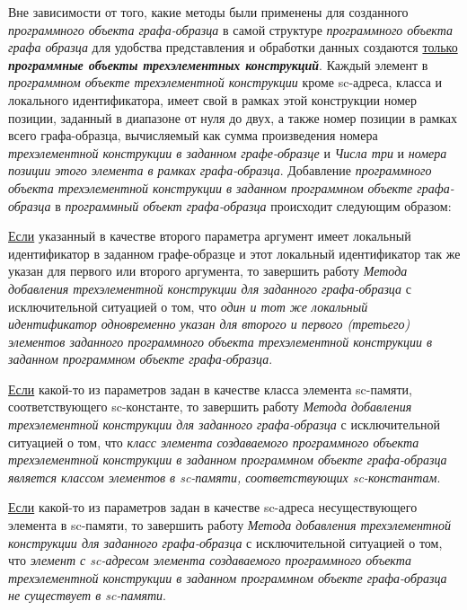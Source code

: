 \begin{SCn}
\begin{scnsubstruct}
\begin{scnsubstruct}
\begin{scnsubstruct}
\begin{scnsubstruct}
\begin{scnsubstruct}
\begin{scnsubstruct}
\begin{scnsubstruct}
\begin{scnsubstruct}
{			Вне зависимости от того, какие методы были применены для созданного \textit{программного объекта графа-образца} в самой структуре \textit{программного объекта графа образца} для удобства представления и обработки данных создаются \uline{только} \textbf{\textit{программные объекты трехэлементных конструкций}}. Каждый элемент в \textit{программном объекте трехэлементной конструкции} кроме sc-адреса, класса и локального идентификатора, имеет свой в рамках этой конструкции номер позиции, заданный в диапазоне от нуля до двух, а также номер позиции в рамках всего графа-образца, вычисляемый как сумма произведения номера \textit{трехэлементной конструкции в заданном графе-образце} и \textit{Числа три} и \textit{номера позиции этого элемента в рамках графа-образца}. Добавление \textit{программного объекта трехэлементной конструкции в заданном программном объекте графа-образца} в \textit{программный объект графа-образца} происходит следующим образом:
			\begin{scnitemize}
				\item \uline{Если} указанный в качестве второго параметра аргумент имеет локальный идентификатор в заданном графе-образце и этот локальный идентификатор так же указан для первого или второго аргумента, то завершить работу \textit{Метода добавления трехэлементной конструкции для заданного графа-образца} с исключительной ситуацией о том, что \textit{один и тот же локальный идентификатор одновременно указан для второго и первого (третьего) элементов заданного программного объекта трехэлементной конструкции в заданном программном объекте графа-образца}.
				\item \uline{Если} какой-то из параметров задан в качестве класса элемента sc-памяти, соответствующего sc-константе, то завершить работу \textit{Метода добавления трехэлементной конструкции для заданного графа-образца} с исключительной ситуацией о том, что \textit{класс элемента создаваемого программного объекта трехэлементной конструкции в заданном программном объекте графа-образца является классом элементов в sc-памяти, соответствующих sc-константам}.
				\item \uline{Если} какой-то из параметров задан в качестве sc-адреса несуществующего элемента в sc-памяти, то завершить работу \textit{Метода добавления трехэлементной конструкции для заданного графа-образца} с исключительной ситуацией о том, что \textit{элемент с sc-адресом элемента создаваемого программного объекта трехэлементной конструкции в заданном программном объекте графа-образца не существует в sc-памяти}.

\end{scnitemize}}
\end{scnsubstruct}
\end{scnsubstruct}
\end{scnsubstruct}
\end{scnsubstruct}
\end{scnsubstruct}
\end{scnsubstruct}
\end{scnsubstruct}
\end{scnsubstruct}
\end{SCn}
